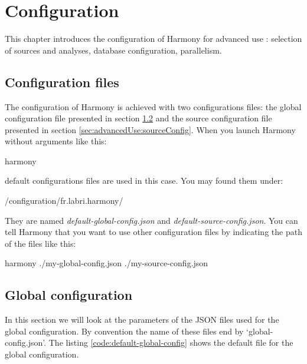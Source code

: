 \chapter{Configuration}\label{chap:configuration}

This chapter introduces the configuration of Harmony for advanced use : selection of sources and analyses, database configuration, parallelism.

	\section{Configuration files}
The configuration of Harmony is achieved with two configurations files: the global configuration file presented in section \ref{sec:advancedUse:globalConfig} and the source configuration file presented in section \ref{sec:advancedUse:sourceConfig}. When you launch Harmony without arguments like this:	

\begin{unixcom}
  harmony
\end{unixcom}

default configurations files are used in this case. You may found them under:
\begin{unixcom}
	 /configuration/fr.labri.harmony/  
\end{unixcom}
They are named \emph{default-global-config.json} and \emph{default-source-config.json}. You can tell Harmony that you want to use other configuration files by indicating the path of the files like this:

\begin{unixcom}
  harmony ./my-global-config.json ./my-source-config.json
\end{unixcom}

	\section{Global configuration}\label{sec:advancedUse:globalConfig}
In this section we will look at the parameters of the JSON files used for the global configuration. By convention the name of these files end by `global-config.json'. The listing \ref{code:default-global-config} shows the default file for the global configuration.



